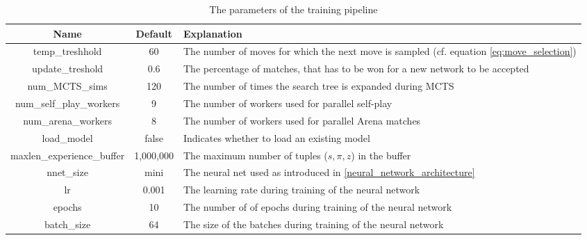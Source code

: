 \begin{table}
    \begin{center}
        \begin{tabularx}{\textwidth}{ c|c|X }
            Name                       & Default   & Explanation                                                                                   \\
            \hline
            \hline
            temp\_treshhold            & 60        & The number of moves for which the next move is sampled (cf. equation \ref{eq:move_selection}) \\
            update\_treshold           & 0.6       & The percentage of matches, that has to be won for a new network to be accepted                \\
            num\_MCTS\_sims            & 120       & The number of times the search tree is expanded during MCTS                                   \\
            num\_self\_play\_workers   & 9         & The number of workers used for parallel self-play                                             \\
            num\_arena\_workers        & 8         & The number of workers used for parallel Arena matches                                         \\
            load\_model                & false     & Indicates whether to load an existing model                                                   \\
            maxlen\_experience\_buffer & 1,000,000 & The maximum number of tuples ($s, \pi, z$) in the buffer                                      \\
            nnet\_size                 & mini      & The neural net used as introduced in \ref{neural_network_architecture}                        \\
            lr                         & 0.001     & The learning rate during training of the neural network                                       \\
            epochs                     & 10        & The number of of epochs during training of the neural network                                 \\
            batch\_size                & 64        & The size of the batches during training of the neural network                                 \\
        \end{tabularx}
    \end{center}
    \caption{The parameters of the training pipeline}
    \label{parameter_table}
\end{table}


